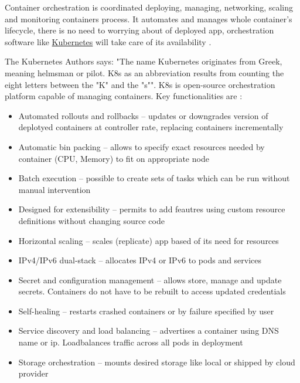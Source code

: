 Container orchestration is coordinated deploying, managing, networking, scaling and monitoring containers process. It automates and manages whole container's lifecycle, there is no need to worrying about of deployed app, orchestration software like \href{https://kubernetes.io/}{Kubernetes} will take care of its availability \cite{RedhatContainerization}.

The Kubernetes Authors says: "The name Kubernetes originates from Greek, meaning helmsman or pilot. K8s as an abbreviation results from counting the eight letters between the "K" and the "s"". K8s is open-source orchestration platform capable of managing containers. Key functionalities are \cite{KubernetesDocs}:

\begin{itemize}
    \item Automated rollouts and rollbacks -- updates or downgrades version of deplotyed containers at controller rate, replacing containers incrementally
    \item Automatic bin packing --  allows to specify exact resources needed by container (CPU, Memory) to fit on appropriate node
    \item Batch execution -- possible to create sets of tasks which can be run without manual intervention
    \item Designed for extensibility -- permits to add feautres using custom resource definitions without changing source code
    \item Horizontal scaling -- scales (replicate) app based of its need for resources
    \item IPv4/IPv6 dual-stack -- allocates IPv4 or IPv6 to pods and services
    \item Secret and configuration management -- allows store, manage and update secrets. Containers do not have to be rebuilt to access updated  credentials
    \item Self-healing -- restarts crashed containers or by failure specified by user
    \item Service discovery and load balancing -- advertises a container using DNS name or ip. Loadbalances traffic across all pods in deployment
    \item Storage orchestration -- mounts desired storage like local or shipped by cloud provider
\end{itemize}




